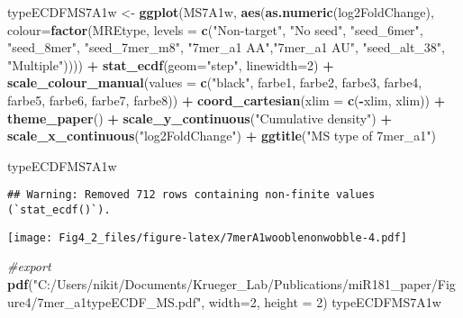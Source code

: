 \documentclass[
]{article}
\newenvironment{Shaded}{\begin{snugshade}}{\end{snugshade}}
\newcommand{\AttributeTok}[1]{\textcolor[rgb]{0.13,0.29,0.53}{#1}}
\newcommand{\CommentTok}[1]{\textcolor[rgb]{0.56,0.35,0.01}{\textit{#1}}}
\newcommand{\DecValTok}[1]{\textcolor[rgb]{0.00,0.00,0.81}{#1}}
\newcommand{\FunctionTok}[1]{\textcolor[rgb]{0.13,0.29,0.53}{\textbf{#1}}}
\newcommand{\NormalTok}[1]{#1}
\newcommand{\OtherTok}[1]{\textcolor[rgb]{0.56,0.35,0.01}{#1}}
\newcommand{\SpecialCharTok}[1]{\textcolor[rgb]{0.81,0.36,0.00}{\textbf{#1}}}
\newcommand{\StringTok}[1]{\textcolor[rgb]{0.31,0.60,0.02}{#1}}
\begin{document}
\begin{Shaded}
\begin{Highlighting}[]
\NormalTok{typeECDFMS7A1w }\OtherTok{\textless{}{-}} \FunctionTok{ggplot}\NormalTok{(MS7A1w, }\FunctionTok{aes}\NormalTok{(}\FunctionTok{as.numeric}\NormalTok{(log2FoldChange), }
                              \AttributeTok{colour=}\FunctionTok{factor}\NormalTok{(MREtype, }\AttributeTok{levels =} \FunctionTok{c}\NormalTok{(}\StringTok{"Non{-}target"}\NormalTok{, }\StringTok{"No seed"}\NormalTok{, }\StringTok{"seed\_6mer"}\NormalTok{, }\StringTok{"seed\_8mer"}\NormalTok{, }\StringTok{"seed\_7mer\_m8"}\NormalTok{, }\StringTok{"7mer\_a1 AA"}\NormalTok{,}\StringTok{"7mer\_a1 AU"}\NormalTok{, }\StringTok{"seed\_alt\_38"}\NormalTok{, }\StringTok{"Multiple"}\NormalTok{)))) }\SpecialCharTok{+} 
  \FunctionTok{stat\_ecdf}\NormalTok{(}\AttributeTok{geom=}\StringTok{"step"}\NormalTok{, }\AttributeTok{linewidth=}\DecValTok{2}\NormalTok{) }\SpecialCharTok{+}
  \FunctionTok{scale\_colour\_manual}\NormalTok{(}\AttributeTok{values =} \FunctionTok{c}\NormalTok{(}\StringTok{"black"}\NormalTok{, farbe1, farbe2, farbe3, farbe4, farbe5, farbe6, farbe7, farbe8)) }\SpecialCharTok{+}
  \FunctionTok{coord\_cartesian}\NormalTok{(}\AttributeTok{xlim =} \FunctionTok{c}\NormalTok{(}\SpecialCharTok{{-}}\NormalTok{xlim, xlim)) }\SpecialCharTok{+} 
  \FunctionTok{theme\_paper}\NormalTok{() }\SpecialCharTok{+}
  \FunctionTok{scale\_y\_continuous}\NormalTok{(}\StringTok{"Cumulative density"}\NormalTok{) }\SpecialCharTok{+} \FunctionTok{scale\_x\_continuous}\NormalTok{(}\StringTok{"log2FoldChange"}\NormalTok{) }\SpecialCharTok{+}
  \FunctionTok{ggtitle}\NormalTok{(}\StringTok{"MS type of 7mer\_a1"}\NormalTok{)}

\NormalTok{typeECDFMS7A1w}
\end{Highlighting}
\end{Shaded}

\begin{verbatim}
## Warning: Removed 712 rows containing non-finite values (`stat_ecdf()`).
\end{verbatim}

\texttt{[image: Fig4\_2\_files/figure-latex/7merA1wooblenonwobble-4.pdf]}

\begin{Shaded}
\begin{Highlighting}[]
\CommentTok{\#export}
\FunctionTok{pdf}\NormalTok{(}\StringTok{"C:/Users/nikit/Documents/Krueger\_Lab/Publications/miR181\_paper/Figure4/7mer\_a1typeECDF\_MS.pdf"}\NormalTok{, }\AttributeTok{width=}\DecValTok{2}\NormalTok{, }\AttributeTok{height =} \DecValTok{2}\NormalTok{)}
\NormalTok{typeECDFMS7A1w}
\end{Highlighting}
\end{Shaded}
\end{document}
